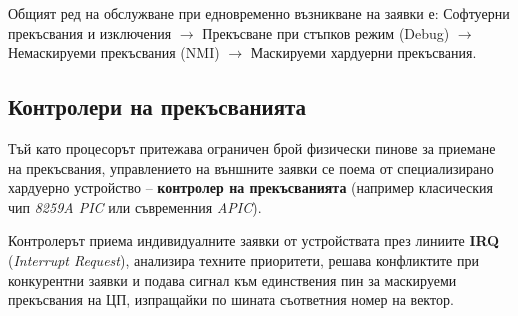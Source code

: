 \documentclass{scrartcl}
\begin{document}
\begin{FlushLeft}
Общият ред на обслужване при едновременно възникване на заявки е:
Софтуерни прекъсвания и изключения $\rightarrow$ Прекъсване при стъпков режим (Debug) $\rightarrow$ Немаскируеми прекъсвания (NMI) $\rightarrow$ Маскируеми хардуерни прекъсвания.

\subsection{Контролери на прекъсванията}
Тъй като процесорът притежава ограничен брой физически пинове за приемане на прекъсвания, управлението на външните заявки се поема от специализирано хардуерно устройство – \textbf{контролер на прекъсванията} (например класическия чип \textit{8259A PIC} или съвременния \textit{APIC}).

Контролерът приема индивидуалните заявки от устройствата през линиите \textbf{IRQ} (\textit{Interrupt Request}), анализира техните приоритети, решава конфликтите при конкурентни заявки и подава сигнал към единствения пин за маскируеми прекъсвания на ЦП, изпращайки по шината съответния номер на вектор.

\end{FlushLeft}
\end{document}
